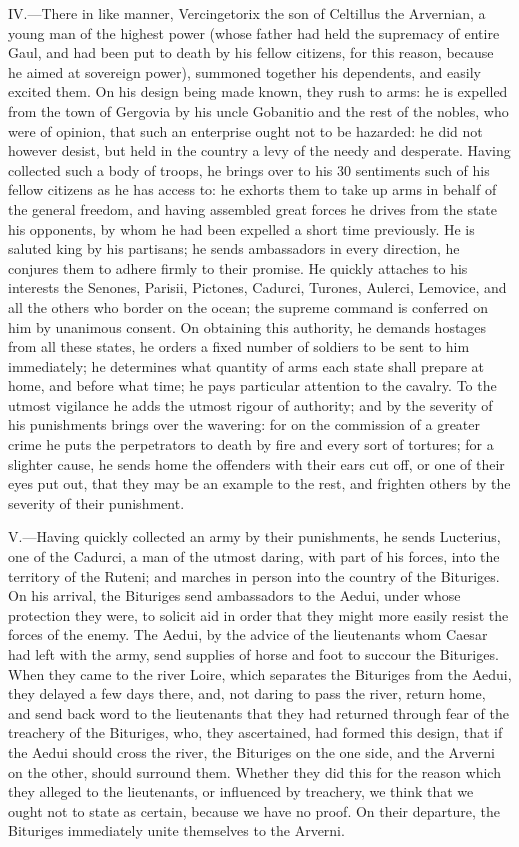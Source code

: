 IV.—There in like manner, Vercingetorix the son of Celtillus the
Arvernian, a young man of the highest power (whose father had held the
supremacy of entire Gaul, and had been put to death by his fellow
citizens, for this reason, because he aimed at sovereign power),
summoned together his dependents, and easily excited them. On his design
being made known, they rush to arms: he is expelled from the town of
Gergovia by his uncle Gobanitio and the rest of the nobles, who were of
opinion, that such an enterprise ought not to be hazarded: he did not
however desist, but held in the country a levy of the needy and
desperate. Having collected such a body of troops, he brings over to his
30 sentiments such of his fellow citizens as he has access to: he
exhorts them to take up arms in behalf of the general freedom, and
having assembled great forces he drives from the state his opponents, by
whom he had been expelled a short time previously. He is saluted king by
his partisans; he sends ambassadors in every direction, he conjures them
to adhere firmly to their promise. He quickly attaches to his interests
the Senones, Parisii, Pictones, Cadurci, Turones, Aulerci, Lemovice, and
all the others who border on the ocean; the supreme command is conferred
on him by unanimous consent. On obtaining this authority, he demands
hostages from all these states, he orders a fixed number of soldiers to
be sent to him immediately; he determines what quantity of arms each
state shall prepare at home, and before what time; he pays particular
attention to the cavalry. To the utmost vigilance he adds the utmost
rigour of authority; and by the severity of his punishments brings over
the wavering: for on the commission of a greater crime he puts the
perpetrators to death by fire and every sort of tortures; for a slighter
cause, he sends home the offenders with their ears cut off, or one of
their eyes put out, that they may be an example to the rest, and
frighten others by the severity of their punishment.

V.—Having quickly collected an army by their punishments, he sends
Lucterius, one of the Cadurci, a man of the utmost daring, with part of
his forces, into the territory of the Ruteni; and marches in person into
the country of the Bituriges. On his arrival, the Bituriges send
ambassadors to the Aedui, under whose protection they were, to solicit
aid in order that they might more easily resist the forces of the enemy.
The Aedui, by the advice of the lieutenants whom Caesar had left with
the army, send supplies of horse and foot to succour the Bituriges. When
they came to the river Loire, which separates the Bituriges from the
Aedui, they delayed a few days there, and, not daring to pass the river,
return home, and send back word to the lieutenants that they had
returned through fear of the treachery of the Bituriges, who, they
ascertained, had formed this design, that if the Aedui should cross the
river, the Bituriges on the one side, and the Arverni on the other,
should surround them. Whether they did this for the reason which they
alleged to the lieutenants, or influenced by treachery, we think that we
ought not to state as certain, because we have no proof. On their
departure, the Bituriges immediately unite themselves to the Arverni.


